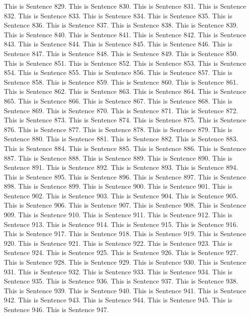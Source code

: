 \documentclass{article}
\begin{document}
This is Sentence 829.
This is Sentence 830.
This is Sentence 831.
This is Sentence 832.
This is Sentence 833.
This is Sentence 834.
This is Sentence 835.
This is Sentence 836.
This is Sentence 837.
This is Sentence 838.
This is Sentence 839.
This is Sentence 840.
This is Sentence 841.
This is Sentence 842.
This is Sentence 843.
This is Sentence 844.
This is Sentence 845.
This is Sentence 846.
This is Sentence 847.
This is Sentence 848.
This is Sentence 849.
This is Sentence 850.
This is Sentence 851.
This is Sentence 852.
This is Sentence 853.
This is Sentence 854.
This is Sentence 855.
This is Sentence 856.
This is Sentence 857.
This is Sentence 858.
This is Sentence 859.
This is Sentence 860.
This is Sentence 861.
This is Sentence 862.
This is Sentence 863.
This is Sentence 864.
This is Sentence 865.
This is Sentence 866.
This is Sentence 867.
This is Sentence 868.
This is Sentence 869.
This is Sentence 870.
This is Sentence 871.
This is Sentence 872.
This is Sentence 873.
This is Sentence 874.
This is Sentence 875.
This is Sentence 876.
This is Sentence 877.
This is Sentence 878.
This is Sentence 879.
This is Sentence 880.
This is Sentence 881.
This is Sentence 882.
This is Sentence 883.
This is Sentence 884.
This is Sentence 885.
This is Sentence 886.
This is Sentence 887.
This is Sentence 888.
This is Sentence 889.
This is Sentence 890.
This is Sentence 891.
This is Sentence 892.
This is Sentence 893.
This is Sentence 894.
This is Sentence 895.
This is Sentence 896.
This is Sentence 897.
This is Sentence 898.
This is Sentence 899.
This is Sentence 900.
This is Sentence 901.
This is Sentence 902.
This is Sentence 903.
This is Sentence 904.
This is Sentence 905.
This is Sentence 906.
This is Sentence 907.
This is Sentence 908.
This is Sentence 909.
This is Sentence 910.
This is Sentence 911.
This is Sentence 912.
This is Sentence 913.
This is Sentence 914.
This is Sentence 915.
This is Sentence 916.
This is Sentence 917.
This is Sentence 918.
This is Sentence 919.
This is Sentence 920.
This is Sentence 921.
This is Sentence 922.
This is Sentence 923.
This is Sentence 924.
This is Sentence 925.
This is Sentence 926.
This is Sentence 927.
This is Sentence 928.
This is Sentence 929.
This is Sentence 930.
This is Sentence 931.
This is Sentence 932.
This is Sentence 933.
This is Sentence 934.
This is Sentence 935.
This is Sentence 936.
This is Sentence 937.
This is Sentence 938.
This is Sentence 939.
This is Sentence 940.
This is Sentence 941.
This is Sentence 942.
This is Sentence 943.
This is Sentence 944.
This is Sentence 945.
This is Sentence 946.
This is Sentence 947.
\end{document}
